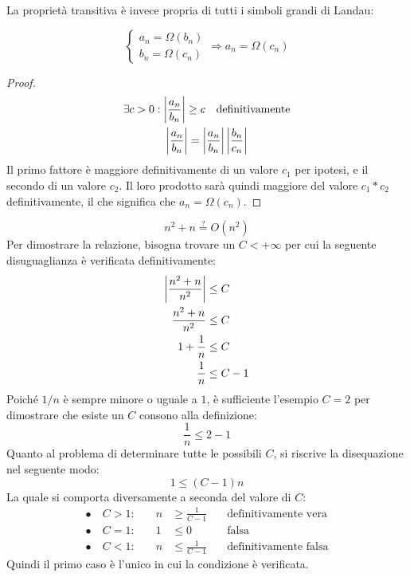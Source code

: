 La proprietà transitiva è invece propria di tutti i simboli grandi di Landau:
\begin{prop}
	\[
		\begin{cases}
			a_n=\Omega(b_n) \\
			b_n=\Omega(c_n)
		\end{cases}\Rightarrow a_n=\Omega(c_n)
	\]
\end{prop}
\begin{proof}
	\begin{gather*}
		\exists c>0: \left\lvert \frac{a_n}{b_n} \right\rvert\geq c\quad\text{definitivamente}\\
		\left\lvert \frac{a_n}{b_n} \right\rvert=\left\lvert \frac{a_n}{b_n} \right\rvert\left\lvert \frac{b_n}{c_n} \right\rvert
	\end{gather*}
	Il primo fattore è maggiore definitivamente di un valore $c_1$ per ipotesi, e il secondo di un valore $c_2$. Il loro prodotto sarà quindi maggiore del valore $c_1*c_2$ definitivamente, il che significa che $a_n=\Omega(c_n)$.
\end{proof}
\begin{examp}
	\[
		n^2+n\overset{?}{=}O(n^2)
	\]
	Per dimostrare la relazione, bisogna trovare un $C<+\infty$ per cui la seguente disuguaglianza è verificata definitivamente:
	\begin{align*}
		\left\lvert \frac{n^2+n}{n^2} \right\rvert & \leq C   \\
		\frac{n^2+n}{n^2}       & \leq C   \\
		1+\frac{1}{n}           & \leq C   \\
		\frac{1}{n}             & \leq C-1
	\end{align*}
	Poiché $1/n$ è sempre minore o uguale a $1$, è sufficiente l'esempio $C=2$ per dimostrare che esiste un $C$ consono alla definizione:
	\[
		\frac{1}{n}\leq 2-1
	\]
	Quanto al problema di determinare tutte le possibili $C$, si riscrive la disequazione nel seguente modo:
	\[
		1\leq(C-1)n
	\]
	La quale si comporta diversamente a seconda del valore di $C$:
	\begin{align*}
		\bullet~ & C>1:\quad & n & \geq\frac{1}{C-1}\quad & \text{definitivamente vera}  \\
		\bullet~ & C=1:\quad & 1 & \leq0\quad             & \text{falsa}                 \\
		\bullet~ & C<1:\quad & n & \leq\frac{1}{C-1}\quad & \text{definitivamente falsa}
	\end{align*}
	Quindi il primo caso è l'unico in cui la condizione è verificata.
\end{examp}

